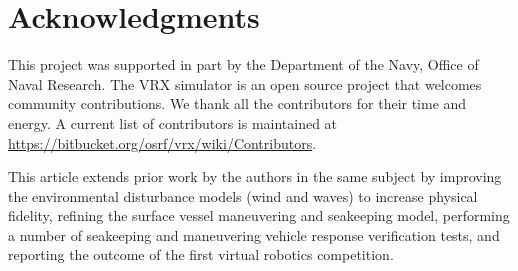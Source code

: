 \documentclass[utf8]{frontiersSCNS} %
\newif\ifoverleaf %
\begin{document}

\section*{Acknowledgments}
This project was supported in part by the Department of the Navy, Office of Naval Research.  The VRX simulator is an open source project that welcomes community contributions.  We thank all the contributors for their time and energy.  A current list of contributors is maintained at \url{https://bitbucket.org/osrf/vrx/wiki/Contributors}.

This article extends prior work by the authors in the same subject \citep{bingham19toward} by improving the environmental disturbance models (wind and waves) to increase physical fidelity, refining the surface vessel maneuvering and seakeeping model, \color{red} performing a number of seakeeping and maneuvering vehicle response verification tests, \color{black} and reporting the outcome of the first virtual robotics competition.

 

\ifoverleaf

\else

\fi
\end{document}
